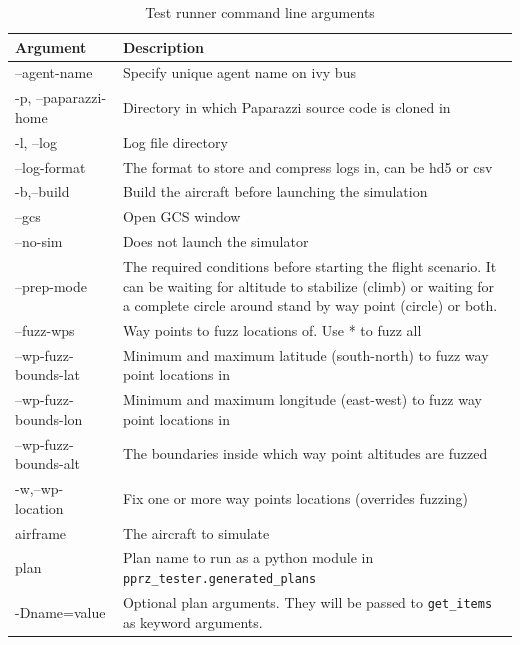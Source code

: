 \begin{table}[]
    \centering
\begin{longtable}{lp{}}
\hline
\textbf{Argument}   & \textbf{Description}\\ \hline
\endhead
%
\hline
\endfoot
%
\endlastfoot
--agent-name          &  Specify unique agent name on ivy bus \\
-p, --paparazzi-home  &  Directory in which Paparazzi source code is cloned in \\
-l, --log             &  Log file directory \\
--log-format          &  The format to store and compress logs in, can be hd5 or csv \\
-b,--build            &  Build the aircraft before launching the simulation \\
--gcs                 &  Open GCS window \\
--no-sim              &  Does not launch the simulator \\
--prep-mode           &  The required conditions before starting the flight scenario. It can be waiting for altitude to stabilize (climb) or waiting for a complete circle around stand by way point (circle) or both. \\
--fuzz-wps            &  Way points to fuzz locations of. Use * to fuzz all \\
--wp-fuzz-bounds-lat  &  Minimum and maximum latitude (south-north) to fuzz way point locations in \\
--wp-fuzz-bounds-lon  &  Minimum and maximum longitude (east-west) to fuzz way point locations in \\
--wp-fuzz-bounds-alt  &  The boundaries inside which way point altitudes are fuzzed \\
-w,--wp-location      &  Fix one or more way points locations (overrides fuzzing) \\
airframe              &  The aircraft to simulate \\
plan                  &  Plan name to run as a python module in \verb|pprz_tester.generated_plans| \\
-Dname=value          &  Optional plan arguments. They will be passed to \verb|get_items| as keyword arguments. \\ \hline
\end{longtable}
\caption{Test runner command line arguments}
\label{tab:test_runner_commandline_args}
\end{table}

